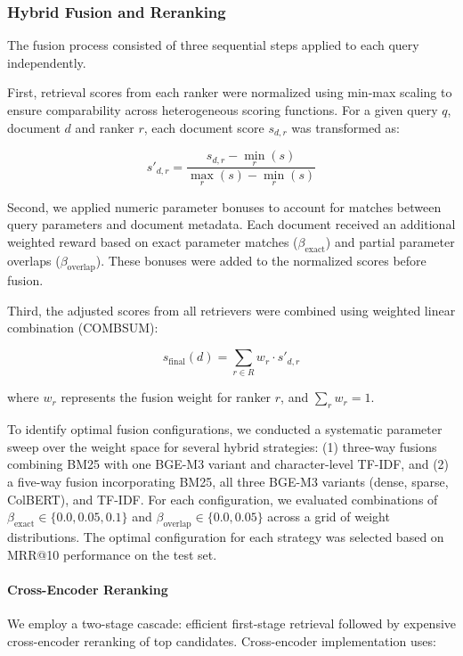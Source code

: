 \documentclass[preprint,12pt]{elsarticle}
\begin{document}
\subsubsection{Hybrid Fusion and Reranking}
\label{subsec:hybrid_fusion}

The fusion process consisted of three sequential steps applied to each query independently.

First, retrieval scores from each ranker were normalized using min-max scaling to ensure comparability across heterogeneous scoring functions. For a given query $q$, document $d$ and ranker $r$, each document score $s_{d,r}$ was transformed as:

\begin{equation}
s'_{d,r} = \frac{s_{d,r} - \min_r(s)}{\max_r(s) - \min_r(s)}
\end{equation}

Second, we applied numeric parameter bonuses to account for matches between query parameters and document metadata. Each document received an additional weighted reward based on exact parameter matches ($\beta_{\text{exact}}$) and partial parameter overlaps ($\beta_{\text{overlap}}$). These bonuses were added to the normalized scores before fusion.

Third, the adjusted scores from all retrievers were combined using weighted linear combination (COMBSUM):

\begin{equation}
s_{\text{final}}(d) = \sum_{r \in R} w_r \cdot s'_{d,r}
\end{equation}

where $w_r$ represents the fusion weight for ranker $r$, and $\sum_{r} w_r = 1$.

To identify optimal fusion configurations, we conducted a systematic parameter sweep over the weight space for several hybrid strategies: (1) three-way fusions combining BM25 with one BGE-M3 variant and character-level TF-IDF, and (2) a five-way fusion incorporating BM25, all three BGE-M3 variants (dense, sparse, ColBERT), and TF-IDF. For each configuration, we evaluated combinations of $\beta_{\text{exact}} \in \{0.0, 0.05, 0.1\}$ and $\beta_{\text{overlap}} \in \{0.0, 0.05\}$ across a grid of weight distributions. The optimal configuration for each strategy was selected based on MRR@10 performance on the test set.

\paragraph{Cross-Encoder Reranking}
We employ a two-stage cascade: efficient first-stage retrieval followed by expensive cross-encoder reranking of top candidates. Cross-encoder implementation uses:
\end{document}
